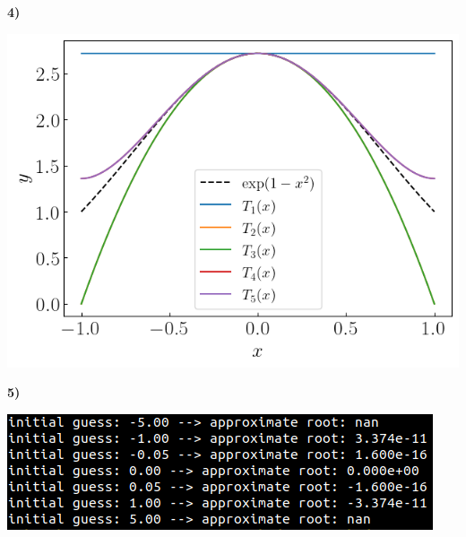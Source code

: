 \documentclass[12pt,a4paper]{article}
\newcommand{\prob}[2]{\textbf{#1)} #2}
\begin{document}
\prob{4}{}

\bef
\includegraphics[scale=0.9]{./prob4.png}
\eef


\prob{5}{}

\bef
\includegraphics[scale=0.75]{./prob5_output.png}
\eef

\end{document}
